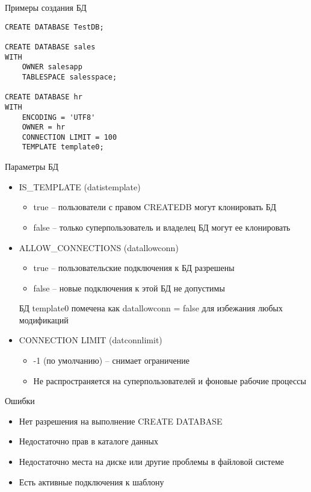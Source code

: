 \documentclass[12pt]{article}
\begin{document}
\begin{Example}{Примеры создания БД}
\begin{lstlisting}
CREATE DATABASE TestDB;

CREATE DATABASE sales 
WITH
    OWNER salesapp
    TABLESPACE salesspace;

CREATE DATABASE hr 
WITH 
    ENCODING = 'UTF8'
    OWNER = hr 
    CONNECTION LIMIT = 100 
    TEMPLATE template0;
\end{lstlisting}
\end{Example}

\begin{nota}{Параметры БД}
    \begin{itemize}
        \item IS\_TEMPLATE (datistemplate)
        
        \begin{itemize}
            \item true -- пользователи с правом CREATEDB могут клонировать БД 
            \item false -- только суперпользователь и владелец БД могут ее клонировать 
        \end{itemize}

        \item ALLOW\_CONNECTIONS (datallowconn)
        
        \begin{itemize}
            \item true -- пользовательские подключения к БД разрешены 
            \item false -- новые подключения к этой БД не допустимы
        \end{itemize}

        БД template0 помечена как datallowconn = false для избежания любых модификаций 
    

        \item CONNECTION LIMIT (datconnlimit)
        
        \begin{itemize}
            \item -1 (по умолчанию) -- снимает ограничение 
            \item Не распространяется на суперпользователей и фоновые рабочие процессы 
        \end{itemize}
    \end{itemize}
\end{nota}

\begin{Remark}{Ошибки}
    \begin{itemize}
        \item Нет разрешения на выполнение CREATE DATABASE
        \item Недостаточно прав в каталоге данных 
        \item Недостаточно места на диске или другие проблемы в файловой системе 
        \item Есть активные подключения к шаблону 
    \end{itemize}
\end{Remark}
\end{document}
